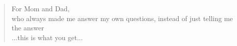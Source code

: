 
\begin{quote}
\hsp
\em
\raggedleft

For Mom and Dad,\\ who always made me answer my own questions, instead of just telling me the answer\\
...this is what you get...
\end{quote}
